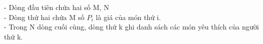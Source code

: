 - Dòng đầu tiên chứa hai số M, N   
\\   - Dòng thứ hai chứa M số $P_{i}$   là giá của món thứ i.   
\\   - Trong N dòng cuối cùng, dòng thứ k ghi danh sách các món yêu thích của người thứ k.